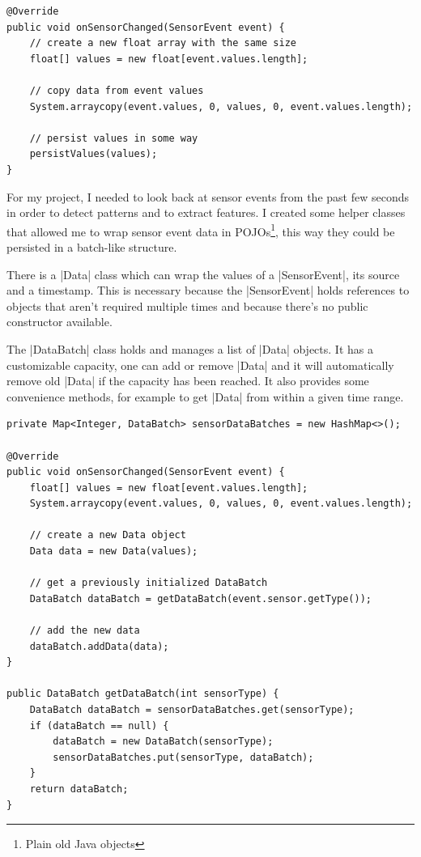 \begin{lstlisting}[label=arraycopy]
@Override
public void onSensorChanged(SensorEvent event) {
	// create a new float array with the same size
	float[] values = new float[event.values.length];

	// copy data from event values
	System.arraycopy(event.values, 0, values, 0, event.values.length);

	// persist values in some way
	persistValues(values);
}
\end{lstlisting}

For my project, I needed to look back at sensor events from the past few seconds in order to detect patterns and to extract features.
I created some helper classes\cite{sensordatalogger:datapackage} that allowed me to wrap sensor event data in POJOs\footnote{Plain old Java objects}, this way they could be persisted in a batch-like structure.

There is a |Data|\cite{sensordatalogger:data} class which can wrap the values of a |SensorEvent|, its source and a timestamp.
This is necessary because the |SensorEvent| holds references to objects that aren't required multiple times and because there's no public constructor available.

The |DataBatch|\cite{sensordatalogger:databatch} class holds and manages a list of |Data| objects.
It has a customizable capacity, one can add or remove |Data| and it will automatically remove old |Data| if the capacity has been reached.
It also provides some convenience methods, for example to get |Data| from within a given time range.

\begin{lstlisting}[label=datahelperclasses]
private Map<Integer, DataBatch> sensorDataBatches = new HashMap<>();

@Override
public void onSensorChanged(SensorEvent event) {
	float[] values = new float[event.values.length];
	System.arraycopy(event.values, 0, values, 0, event.values.length);

	// create a new Data object
	Data data = new Data(values);

	// get a previously initialized DataBatch
	DataBatch dataBatch = getDataBatch(event.sensor.getType());

	// add the new data
	dataBatch.addData(data);
}

public DataBatch getDataBatch(int sensorType) {
	DataBatch dataBatch = sensorDataBatches.get(sensorType);
	if (dataBatch == null) {
		dataBatch = new DataBatch(sensorType);
		sensorDataBatches.put(sensorType, dataBatch);
	}
	return dataBatch;
}
\end{lstlisting}

